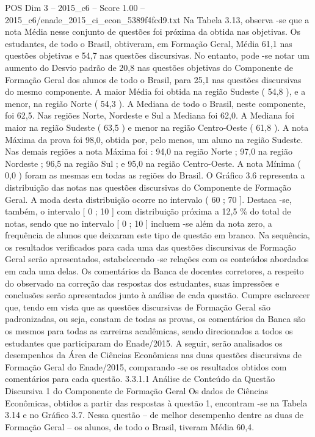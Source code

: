 \begin{textsample}{POS Dim 3 – 2015\_c6 – Score 1.00 – 2015\_c6/enade\_2015\_ci\_econ\_5389f4fcd9.txt}
Na Tabela 3.13, observa -se que a nota Média nesse conjunto de questões foi próxima da obtida nas objetivas.
Os estudantes, de todo o Brasil, obtiveram, em Formação Geral, Média 61,1 nas questões objetivas e 54,7 nas questões discursivas.
No entanto, pode -se notar um aumento do Desvio padrão de 20,8 nas questões objetivas do Componente de Formação Geral dos alunos de todo o Brasil, para 25,1 nas questões discursivas do mesmo componente.
A maior Média foi obtida na região Sudeste ( 54,8 ), e a menor, na região Norte ( 54,3 ).
A Mediana de todo o Brasil, neste componente, foi 62,5.
Nas regiões Norte, Nordeste e Sul a Mediana foi 62,0.
A Mediana foi maior na região Sudeste ( 63,5 ) e menor na região Centro-Oeste ( 61,8 ).
A nota Máxima da prova foi 98,0, obtida por, pelo menos, um aluno na região Sudeste.
Nas demais regiões a nota Máxima foi : 94,0 na região Norte ; 97,0 na região Nordeste ; 96,5 na região Sul ; e 95,0 na região Centro-Oeste.
A nota Mínima ( 0,0 ) foram as mesmas em todas as regiões do Brasil.
O Gráfico 3.6 representa a distribuição das notas nas questões discursivas do Componente de Formação Geral.
A moda desta distribuição ocorre no intervalo ( 60 ; 70 ].
Destaca -se, também, o intervalo [ 0 ; 10 ] com distribuição próxima a 12,5 \% do total de notas, sendo que no intervalo [ 0 ; 10 ] incluem -se além da nota zero, a frequência de alunos que deixaram este tipo de questão em branco.
Na sequência, os resultados verificados para cada uma das questões discursivas de Formação Geral serão apresentados, estabelecendo -se relações com os conteúdos abordados em cada uma delas.
Os comentários da Banca de docentes corretores, a respeito do observado na correção das respostas dos estudantes, suas impressões e conclusões serão apresentados junto à análise de cada questão.
Cumpre esclarecer que, tendo em vista que as questões discursivas de Formação Geral são padronizadas, ou seja, constam de todas as provas, os comentários da Banca são os mesmos para todas as carreiras acadêmicas, sendo direcionados a todos os estudantes que participaram do Enade/2015.
A seguir, serão analisados os desempenhos da Área de Ciências Econômicas nas duas questões discursivas de Formação Geral do Enade/2015, comparando -se os resultados obtidos com comentários para cada questão. 3.3.1.1 Análise de Conteúdo da Questão Discursiva 1 do Componente de Formação Geral Os dados de Ciências Econômicas, obtidos a partir das respostas à questão 1, encontram -se na Tabela 3.14 e no Gráfico 3.7.
Nessa questão – de melhor desempenho dentre as duas de Formação Geral – os alunos, de todo o Brasil, tiveram Média 60,4.

\end{textsample}

